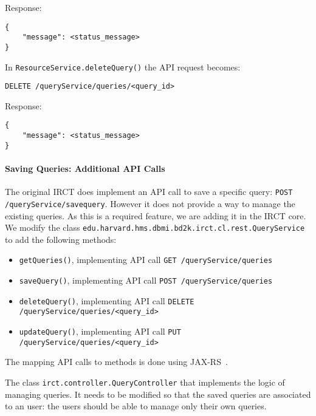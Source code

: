 Response:
\begin{verbatim}
{
    "message": <status_message>
} 
\end{verbatim}

In  \verb|ResourceService.deleteQuery()| the API request becomes:
\begin{verbatim}
DELETE /queryService/queries/<query_id>
\end{verbatim}

Response:
\begin{verbatim}
{
    "message": <status_message>
} 
\end{verbatim}



\paragraph{Saving Queries: Additional API Calls}
\label{sec:irctsavedqueries}

The original IRCT does implement an API call to save a specific query: \verb|POST /queryService/savequery|.
However it does not provide a way to manage the existing queries.
As this is a required feature, we are adding it in the IRCT core.
We modify the class \verb|edu.harvard.hms.dbmi.bd2k.irct.cl.rest.QueryService| to add the following methods:
\begin{itemize}
    \item \verb|getQueries()|, implementing API call \verb|GET /queryService/queries|
    \item \verb|saveQuery()|, implementing API call \verb|POST /queryService/queries|
    \item \verb|deleteQuery()|, implementing API call \verb|DELETE /queryService/queries/<query_id>|
    \item \verb|updateQuery()|, implementing API call \verb|PUT /queryService/queries/<query_id>|
\end{itemize}

The mapping API calls to methods is done using JAX-RS~\cite{wiki:jaxrs}.

The class \verb|irct.controller.QueryController| that implements the logic of managing queries.
It needs to be modified so that the saved queries are associated to an user: the users should be able to manage only their own queries.

